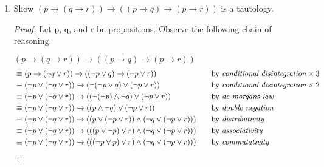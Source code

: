\documentclass{article}
\begin{document}
\begin {enumerate}
\begin{enumerate}
\begin{proof}
        Therefore, $p \rightarrow (q \rightarrow p)$ is a tautology.
        \end{proof}

\hrulefill

      \item
        Show $(p \rightarrow (q \rightarrow r)) \rightarrow ((p \rightarrow q) \rightarrow (p \rightarrow r))$ is a tautology.

        \vspace{2ex}
        \begin{proof}
        Let p, q, and r be propositions. Observe the following chain of reasoning.
        
        \vspace {0.1in}
        
        $(p \rightarrow (q \rightarrow r)) \rightarrow ((p \rightarrow q) \rightarrow (p \rightarrow r))$
        \begin{align*}
          &\equiv (p \rightarrow (\neg q \lor r)) \rightarrow ((\neg p \lor q) \rightarrow (\neg p \lor r))
            &\quad
            &\text{by \emph{conditional disintegration}} \times3 
            \\
          &\equiv (\neg p \lor (\neg q \lor r)) \rightarrow (\neg(\neg p \lor q) \lor (\neg p \lor r))
            &\quad
            &\text{by \emph{conditional disintegration}} \times 2
            \\
          &\equiv (\neg p \lor (\neg q \lor r)) \rightarrow ((\neg(\neg p) \land \neg q) \lor (\neg p \lor r))
            &\quad
            &\text{by \emph{de morgans law}}
            \\
          &\equiv (\neg p \lor (\neg q \lor r)) \rightarrow ((p \land \neg q) \lor (\neg p \lor r))
            &\quad
            &\text{by \emph{double negation}}
            \\
          &\equiv (\neg p \lor (\neg q \lor r)) \rightarrow ((p \lor (\neg p \lor r)) \land (\neg q \lor (\neg p \lor r)))
            &\quad
            &\text{by \emph{distributivity}}
            \\
          &\equiv (\neg p \lor (\neg q \lor r)) \rightarrow (((p \lor \neg p) \lor r) \land (\neg q \lor (\neg p \lor r)))
            &\quad
            &\text{by \emph{associativity}}
            \\
          &\equiv (\neg p \lor (\neg q \lor r)) \rightarrow (((\neg p \lor p) \lor r) \land (\neg q \lor (\neg p \lor r)))
            &\quad
            &\text{by \emph{commutativity}}
            \\

\end{align*}
\end{proof}
\end{enumerate}
\end{enumerate}
\end{document}
